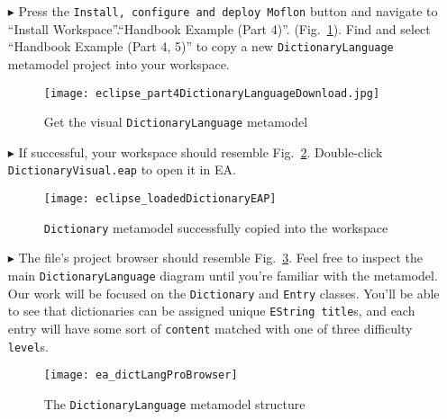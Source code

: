 \begin{itemize}

\item[$\blacktriangleright$] Press the \texttt{Install, configure and deploy Moflon} button and navigate to ``Install Workspace''.``Handbook Example (Part 4)''.
(Fig.~\ref{eclipse:dictionaryDownloadWizard}). Find and select ``Handbook Example (Part 4, 5)'' to copy a new \texttt{Dict\-ion\-ary\-Lang\-uage}
metamodel project into your workspace.

\vspace{0.5cm}

\begin{figure}[htbp]
\begin{center}
  \texttt{[image: eclipse\_part4DictionaryLanguageDownload.jpg]}
  \caption{Get the visual \texttt{DictionaryLanguage} metamodel}
  \label{eclipse:dictionaryDownloadWizard}
\end{center}
\end{figure}

\item[$\blacktriangleright$] If successful, your workspace should resemble Fig.~\ref{eclipse:loadedDictionaryEAP}. Double-click
\texttt{DictionaryVisual.eap} to open it in EA.

\newpage

\begin{figure}[htbp]
\begin{center}
  \texttt{[image: eclipse\_loadedDictionaryEAP]}
  \caption{\texttt{Dictionary} metamodel successfully copied into the workspace}
  \label{eclipse:loadedDictionaryEAP}
\end{center}
\end{figure}

\item[$\blacktriangleright$] The file's project browser should resemble Fig.~\ref{ea:dictionaryLangStart}. Feel free to inspect the main
\texttt{DictionaryLanguage} diagram until you're familiar with the metamodel. Our work will be focused on the \texttt{Dictionary} and \texttt{Entry} classes.
You'll be able to see that dictionaries can be assigned unique \texttt{EString title}s, and each entry will have some sort of \texttt{content} matched with one
of three difficulty \texttt{level}s.

\vspace{0.5cm}

\begin{figure}[htbp]
\begin{center}
  \texttt{[image: ea\_dictLangProBrowser]}
  \caption{The \texttt{DictionaryLanguage} metamodel structure}
  \label{ea:dictionaryLangStart}
\end{center}
\end{figure}


\end{itemize}
